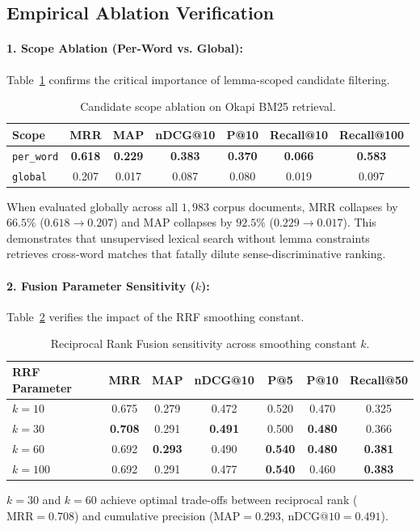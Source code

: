 \subsection{Empirical Ablation Verification}

\paragraph{1. Scope Ablation (Per-Word vs. Global):}
Table~\ref{tab:scope_ablation} confirms the critical importance of lemma-scoped candidate filtering.

\begin{table}[H]
\centering
\small
\begin{tabular}{lcccccc}
\toprule
\textbf{Scope} & \textbf{MRR} & \textbf{MAP} & \textbf{nDCG@10} & \textbf{P@10} & \textbf{Recall@10} & \textbf{Recall@100} \\
\midrule
\texttt{per\_word} & \textbf{0.618} & \textbf{0.229} & \textbf{0.383} & \textbf{0.370} & \textbf{0.066} & \textbf{0.583} \\
\texttt{global} & 0.207 & 0.017 & 0.087 & 0.080 & 0.019 & 0.097 \\
\bottomrule
\end{tabular}
\caption{Candidate scope ablation on Okapi BM25 retrieval.}
\label{tab:scope_ablation}
\end{table}
When evaluated globally across all $1,983$ corpus documents, MRR collapses by $66.5\%$ ($0.618 \to 0.207$) and MAP collapses by $92.5\%$ ($0.229 \to 0.017$). This demonstrates that unsupervised lexical search without lemma constraints retrieves cross-word matches that fatally dilute sense-discriminative ranking.

\paragraph{2. Fusion Parameter Sensitivity ($k$):}
Table~\ref{tab:fusion_ablation} verifies the impact of the RRF smoothing constant.

\begin{table}[H]
\centering
\small
\begin{tabular}{lcccccc}
\toprule
\textbf{RRF Parameter} & \textbf{MRR} & \textbf{MAP} & \textbf{nDCG@10} & \textbf{P@5} & \textbf{P@10} & \textbf{Recall@50} \\
\midrule
$k = 10$ & 0.675 & 0.279 & 0.472 & 0.520 & 0.470 & 0.325 \\
$k = 30$ & \textbf{0.708} & 0.291 & \textbf{0.491} & 0.500 & \textbf{0.480} & 0.366 \\
$k = 60$ & 0.692 & \textbf{0.293} & 0.490 & \textbf{0.540} & \textbf{0.480} & \textbf{0.381} \\
$k = 100$ & 0.692 & 0.291 & 0.477 & \textbf{0.540} & 0.460 & \textbf{0.383} \\
\bottomrule
\end{tabular}
\caption{Reciprocal Rank Fusion sensitivity across smoothing constant $k$.}
\label{tab:fusion_ablation}
\end{table}
$k = 30$ and $k = 60$ achieve optimal trade-offs between reciprocal rank ($\text{MRR} = 0.708$) and cumulative precision ($\text{MAP} = 0.293$, $\text{nDCG@10} = 0.491$).

